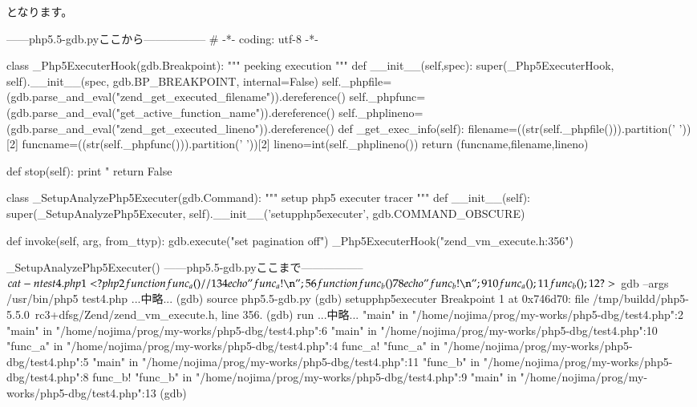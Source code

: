 \documentclass[mingoth,a4paper,twoside]{jsarticle}
\begin{document}
となります。

\begin{commandline}
------php5.5-gdb.pyここから-----------------
# -*- coding: utf-8 -*-

class _Php5ExecuterHook(gdb.Breakpoint):
    """ peeking execution """
    def __init__(self,spec):
        super(_Php5ExecuterHook, self).__init__(spec,
                                               gdb.BP_BREAKPOINT,
                                               internal=False)
        self._phpfile=(gdb.parse_and_eval("zend_get_executed_filename")).dereference()
        self._phpfunc=(gdb.parse_and_eval("get_active_function_name")).dereference()
        self._phplineno=(gdb.parse_and_eval("zend_get_executed_lineno")).dereference()
    def _get_exec_info(self):
        filename=((str(self._phpfile())).partition(' '))[2]
        funcname=((str(self._phpfunc())).partition(' '))[2]
        lineno=int(self._phplineno())
        return (funcname,filename,lineno)

    def stop(self):
        print "%
        return False

class _SetupAnalyzePhp5Executer(gdb.Command):
    """ setup php5 executer tracer """
    def __init__(self):
        super(_SetupAnalyzePhp5Executer, self).__init__('setupphp5executer',
                                                  gdb.COMMAND_OBSCURE)

    def invoke(self, arg, from_ttyp):
        gdb.execute("set pagination off")
        _Php5ExecuterHook("zend_vm_execute.h:356")

_SetupAnalyzePhp5Executer()
------php5.5-gdb.pyここまで-----------------
$ cat -n test4.php
     1	<?php
     2	function func_a() // 1
     3	{
     4		echo "func_a!\n";
     5	}
     6	function func_b()
     7	{
     8		echo "func_b!\n";
     9	}
    10	func_a();
    11	func_b();
    12	?>
$ gdb --args /usr/bin/php5 test4.php
...中略...
(gdb) source php5.5-gdb.py
(gdb) setupphp5executer
Breakpoint 1 at 0x746d70: file /tmp/buildd/php5-5.5.0~rc3+dfsg/Zend/zend_vm_execute.h, line 356.
(gdb) run
...中略...
"main" in "/home/nojima/prog/my-works/php5-dbg/test4.php":2
"main" in "/home/nojima/prog/my-works/php5-dbg/test4.php":6
"main" in "/home/nojima/prog/my-works/php5-dbg/test4.php":10
"func_a" in "/home/nojima/prog/my-works/php5-dbg/test4.php":4
func_a!
"func_a" in "/home/nojima/prog/my-works/php5-dbg/test4.php":5
"main" in "/home/nojima/prog/my-works/php5-dbg/test4.php":11
"func_b" in "/home/nojima/prog/my-works/php5-dbg/test4.php":8
func_b!
"func_b" in "/home/nojima/prog/my-works/php5-dbg/test4.php":9
"main" in "/home/nojima/prog/my-works/php5-dbg/test4.php":13
(gdb)
\end{commandline}
\end{document}
